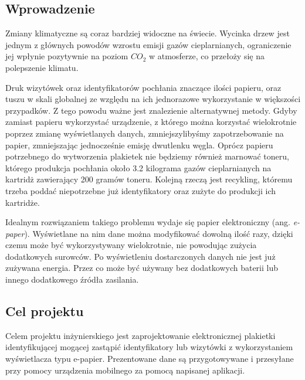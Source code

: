 \documentclass[a4paper,12pt, twoside]{article}
\begin{document}
    	\subsection{Wprowadzenie}
    	Zmiany klimatyczne są coraz bardziej widoczne na świecie. Wycinka drzew jest jednym z głównych powodów wzrostu emisji gazów cieplarnianych\cite{clima_causes}, ograniczenie jej wpłynie pozytywnie na poziom ${CO_{2}}$ w atmosferze, co przełoży się na polepszenie klimatu. 
    	
    	Druk wizytówek oraz identyfikatorów pochłania znaczące ilości papieru, oraz tuszu w skali globalnej ze względu na ich jednorazowe wykorzystanie w większości przypadków. Z tego powodu ważne jest znalezienie alternatywnej metody. Gdyby zamiast papieru wykorzystać urządzenie, z którego można korzystać wielokrotnie poprzez zmianę wyświetlanych danych, zmniejszylibyśmy zapotrzebowanie na papier, zmniejszając jednocześnie emisję dwutlenku węgla. Oprócz papieru potrzebnego do wytworzenia plakietek nie będziemy również marnować toneru, którego produkcja pochłania około 3.2 kilograma gazów cieplarnianych\cite{cartidge_production} na kartridż zawierający 200 gramów toneru. Kolejną rzeczą jest recykling, któremu trzeba poddać niepotrzebne już identyfikatory oraz zużyte do produkcji ich kartridże.
    	
    	Idealnym rozwiązaniem takiego problemu wydaje się papier elektroniczny (ang. \textit{e-paper}). Wyświetlane na nim dane można modyfikować dowolną ilość razy, dzięki czemu może być wykorzystywany wielokrotnie, nie powodując zużycia dodatkowych surowców. Po wyświetleniu dostarczonych danych nie jest już zużywana energia. Przez co może być używany bez dodatkowych baterii lub innego dodatkowego źródła zasilania.
    	\newpage
    	
    	
    	\subsection{Cel projektu}
    	Celem projektu inżynierskiego jest zaprojektowanie elektronicznej plakietki identyfikującej mogącej zastąpić identyfikatory lub wizytówki z wykorzystaniem wyświetlacza typu e-papier. Prezentowane dane są przygotowywane i przesyłane przy pomocy urządzenia mobilnego za pomocą napisanej aplikacji.
    
\end{document}
